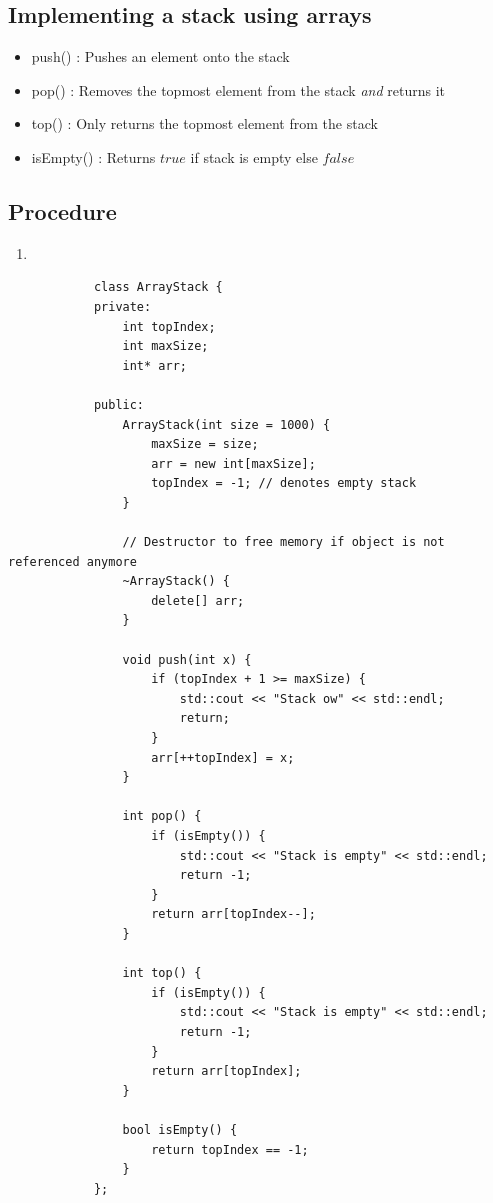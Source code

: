 \documentclass[a4paper, 12pt]{book}
\begin{document}
	\subsection{Implementing a stack using arrays} 
	
	\begin{itemize}
		\item push() : Pushes an element onto the stack
		\item pop() : Removes the topmost element from the stack \emph{and} returns it
		\item {top()} : Only returns the topmost element from the stack 
		\item {isEmpty()} : Returns $true$ if stack is empty else $false$
	\end{itemize}
	\vspace{\baselineskip}
	\subsection{Procedure}
	\begin{enumerate}
		\item 
	\end{enumerate}
	\newpage
	
	\begin{tcolorbox}[title=ArrayStack class]
		\begin{verbatim}
			class ArrayStack {
			private:
				int topIndex;
				int maxSize;
				int* arr;
				
			public:
				ArrayStack(int size = 1000) {
					maxSize = size;
					arr = new int[maxSize];
					topIndex = -1; // denotes empty stack
				}
				
				// Destructor to free memory if object is not referenced anymore
				~ArrayStack() {
					delete[] arr;
				}
				
				void push(int x) {
					if (topIndex + 1 >= maxSize) {
						std::cout << "Stack ow" << std::endl;
						return;
					}
					arr[++topIndex] = x;
				}
				
				int pop() {
					if (isEmpty()) {
						std::cout << "Stack is empty" << std::endl;
						return -1;
					}
					return arr[topIndex--];
				}
				
				int top() {
					if (isEmpty()) {
						std::cout << "Stack is empty" << std::endl;
						return -1;
					}
					return arr[topIndex];
				}
				
				bool isEmpty() {
					return topIndex == -1;
				}
			};
		\end{verbatim}
	\end{tcolorbox}
	
\end{document}
